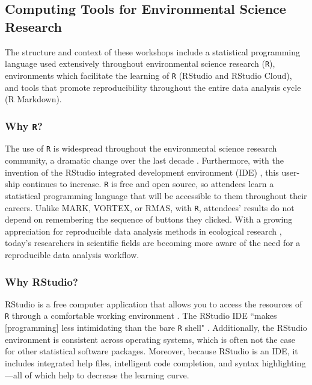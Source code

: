 \documentclass[12pt]{article}
\begin{document}
\subsection{Computing Tools for Environmental Science Research}  

\noindent The structure and context of these workshops include a statistical
programming language used extensively throughout environmental science research
(\texttt{R}), environments which facilitate the learning of \texttt{R}
(RStudio and RStudio Cloud), and tools that promote reproducibility throughout
the entire data analysis cycle (R Markdown).

\subsubsection{Why \texttt{R}?} 

\noindent The use of \texttt{R} is widespread throughout the environmental science
research community, a dramatic change over the last decade \citep{Rpopular}. 
Furthermore, with the invention of the RStudio integrated development 
environment (IDE) \citep{rstudio}, this user-ship continues to increase. 
\texttt{R} is free and open source, so attendees learn a statistical
programming language that will be accessible to them throughout their careers.
Unlike MARK, VORTEX, or RMAS, with \texttt{R}, attendees' results do not depend
on remembering the sequence of buttons they clicked. With a growing appreciation
for reproducible data analysis methods in ecological research 
\citep{reproducibilty-comment, repeatability, pva, reproducibility_ecology},
today's researchers in scientific fields are becoming more aware of the need for
a reproducible data analysis workflow. 

\subsubsection{Why RStudio?}

\noindent RStudio is a free computer application that allows you to access the 
resources of \texttt{R} through a comfortable working
environment \citep{rstudio}. The RStudio IDE ``makes [programming] less
intimidating than the bare \texttt{R} shell" \citep[p.\ 59]{mine}. Additionally,
the RStudio environment is consistent across operating systems, which is often
not the case for other statistical software packages. Moreover, because RStudio
is an IDE, it includes integrated help files, intelligent code completion, and
syntax highlighting---all of which help to decrease the learning curve. 
\end{document}
